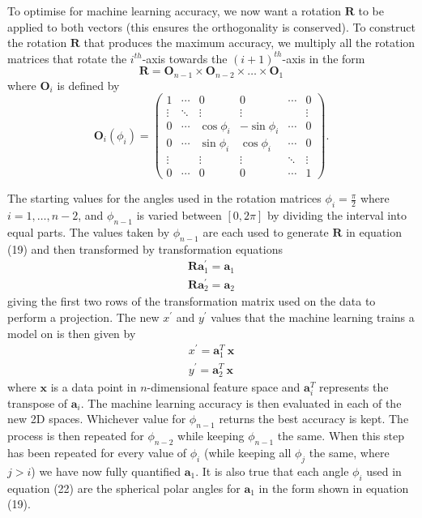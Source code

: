 \documentclass[a4paper,11pt,twoside]{article}
\begin{document}
To optimise for machine learning accuracy, we now want a rotation $\bm{R}$ to be applied to both vectors (this ensures the orthogonality is conserved). To construct the rotation $\bm{R}$ that produces the maximum accuracy, we multiply all the rotation matrices that rotate the $i^{th}$-axis towards the $(i+1)^{th}$-axis in the form
\begin{equation}
\bm{R}=\bm{O}_{n-1} \times \bm{O}_{n-2} \times \dotsc \times \bm{O}_{1} 
\end{equation}
where $\bm{O}_{i}$ is defined by
\begin{equation}
\bm{O}_i(\phi_i) = 
\begin{pmatrix}
  1 &  \cdots & 0 & 0 & \cdots &  0 \\
  \vdots  &  \ddots & \vdots& \vdots & &\vdots  \\
  0 & \cdots & \cos{\phi_i} & -\sin{\phi_i} &  \cdots & 0 \\
  0 &  \cdots & \sin{\phi_i} & \cos{\phi_i} &  \cdots & 0 \\
  \vdots  &  \ & \vdots& \vdots &\ddots&\vdots  \\
  0 & \cdots & 0 & 0 & \cdots & 1
 \end{pmatrix}.
\end{equation}

The starting values for the angles used in the rotation matrices $\phi_i=\frac{\pi}{2}$ where $i=1,\dotsc,n-2$, and $\phi_{n-1}$ is varied between $[0, 2\pi]$ by dividing the interval into equal parts. The values taken by $\phi_{n-1}$ are each used to generate $\bm{R}$ in equation (19) and then transformed by transformation equations
\begin{equation}
\begin{split}
\bm{R} \bm{a}_1^{\prime} = \bm{a}_1
\\
\bm{R} \bm{a}_2^{\prime} = \bm{a}_2
\end{split}
\end{equation}
giving the first two rows of the transformation matrix used on the data to perform a projection. The new $x^{\prime}$ and $y^{\prime}$ values that the machine learning trains a model on is then given by
\begin{equation}
\begin{split}
x^{\prime}=\bm{a}_1^T \ \bm{x}
\\
y^{\prime}=\bm{a}_2^T \ \bm{x}
\end{split}
\end{equation}
where $\bm{x}$ is a data point in $n$-dimensional feature space and $\bm{a}_i^T$ represents the transpose of $\bm{a}_i$. The machine learning accuracy is then evaluated in each of the new 2D spaces. Whichever value for $\phi_{n-1}$ returns the best accuracy is kept. The process is then repeated for $\phi_{n-2}$ while keeping $\phi_{n-1}$ the same. When this step has been repeated for every value of $\phi_i$ (while keeping all $\phi_{j}$ the same, where $j>i$) we have now fully quantified $\bm{a}_1$. It is also true that each angle $\phi_i$ used in equation (22) are the spherical polar angles for $\bm{a}_1$ in the form shown in equation (19).
\newline
\end{document}
